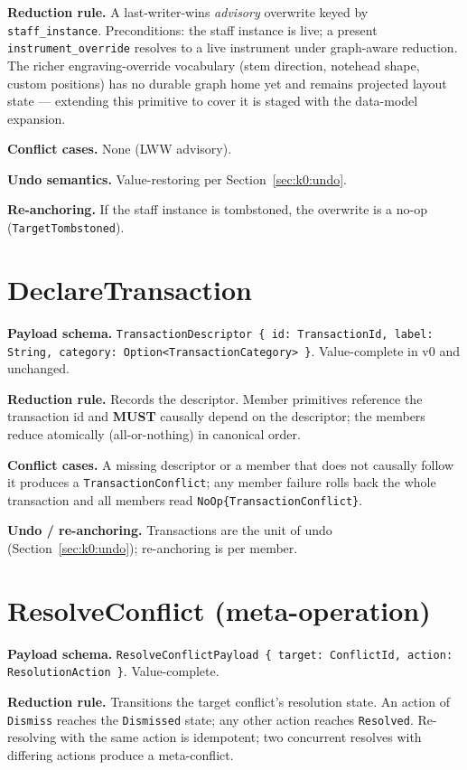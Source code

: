 \documentclass[11pt,letterpaper]{report}
\newcommand{\MUST}{\textbf{MUST}}
\begin{document}
\textbf{Reduction rule.} A last-writer-wins \emph{advisory} overwrite keyed by
\texttt{staff\_instance}. Preconditions: the staff instance is live; a present
\texttt{instrument\_override} resolves to a live instrument under graph-aware
reduction. The richer engraving-override vocabulary (stem direction, notehead
shape, custom positions) has no durable graph home yet and remains projected
layout state --- extending this primitive to cover it is staged with the
data-model expansion.

\textbf{Conflict cases.} None (LWW advisory).

\textbf{Undo semantics.} Value-restoring per Section~\ref{sec:k0:undo}.

\textbf{Re-anchoring.} If the staff instance is tombstoned, the overwrite is a
no-op (\texttt{TargetTombstoned}).

\section{DeclareTransaction}
\label{sec:k0:declare-transaction}

\textbf{Payload schema.} \texttt{TransactionDescriptor \{ id: TransactionId,
label: String, category: Option<TransactionCategory> \}}. Value-complete in v0
and unchanged.

\textbf{Reduction rule.} Records the descriptor. Member primitives reference the
transaction id and \MUST{} causally depend on the descriptor; the members reduce
atomically (all-or-nothing) in canonical order.

\textbf{Conflict cases.} A missing descriptor or a member that does not causally
follow it produces a \texttt{TransactionConflict}; any member failure rolls back
the whole transaction and all members read \texttt{NoOp\{TransactionConflict\}}.

\textbf{Undo / re-anchoring.} Transactions are the unit of undo
(Section~\ref{sec:k0:undo}); re-anchoring is per member.

\section{ResolveConflict (meta-operation)}
\label{sec:k0:resolve-conflict}

\textbf{Payload schema.} \texttt{ResolveConflictPayload \{ target: ConflictId,
action: ResolutionAction \}}. Value-complete.

\textbf{Reduction rule.} Transitions the target conflict's resolution state. An
action of \texttt{Dismiss} reaches the \texttt{Dismissed} state; any other action
reaches \texttt{Resolved}. Re-resolving with the same action is idempotent; two
concurrent resolves with differing actions produce a meta-conflict.
\end{document}
